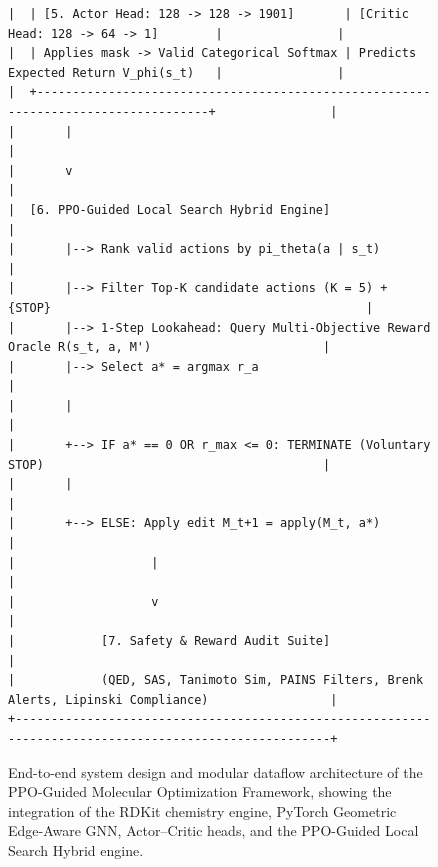 \documentclass{ieeeaccess}
\begin{document}
\begin{figure}[!tbp]
\begin{verbatim}
|  | [5. Actor Head: 128 -> 128 -> 1901]       | [Critic Head: 128 -> 64 -> 1]        |                |
|  | Applies mask -> Valid Categorical Softmax | Predicts Expected Return V_phi(s_t)   |                |
|  +-----------------------------------------------------------------------------------+                |
|       |                                                                                               |
|       v                                                                                               |
|  [6. PPO-Guided Local Search Hybrid Engine]                                                           |
|       |--> Rank valid actions by pi_theta(a | s_t)                                                    |
|       |--> Filter Top-K candidate actions (K = 5) + {STOP}                                            |
|       |--> 1-Step Lookahead: Query Multi-Objective Reward Oracle R(s_t, a, M')                        |
|       |--> Select a* = argmax r_a                                                                     |
|       |                                                                                               |
|       +--> IF a* == 0 OR r_max <= 0: TERMINATE (Voluntary STOP)                                       |
|       |                                                                                               |
|       +--> ELSE: Apply edit M_t+1 = apply(M_t, a*)                                                    |
|                   |                                                                                   |
|                   v                                                                                   |
|            [7. Safety & Reward Audit Suite]                                                           |
|            (QED, SAS, Tanimoto Sim, PAINS Filters, Brenk Alerts, Lipinski Compliance)                 |
+-------------------------------------------------------------------------------------------------------+
\end{verbatim}
\caption{End-to-end system design and modular dataflow architecture of the PPO-Guided Molecular Optimization Framework, showing the integration of the RDKit chemistry engine, PyTorch Geometric Edge-Aware GNN, Actor--Critic heads, and the PPO-Guided Local Search Hybrid engine.}
\label{fig:system_workflow}
\end{figure}
\end{document}
